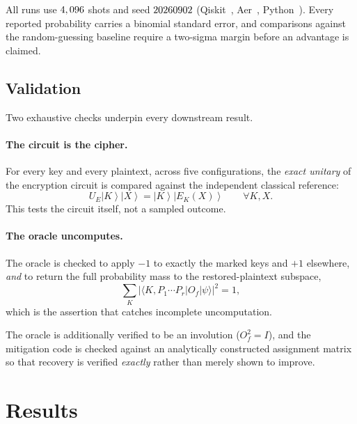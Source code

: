 \documentclass[11pt,a4paper]{article}
\newcommand{\ket}[1]{\left|#1\right\rangle}
\newcommand{\Ek}{E_K}
\begin{document}
All runs use $4,096$ shots and seed $20260902$
(Qiskit~\RunQiskit, Aer~\RunAer, Python~\RunPython). Every reported probability
carries a binomial standard error, and comparisons against the random-guessing
baseline require a two-sigma margin before an advantage is claimed.

\subsection{Validation}
\label{sec:validation}

Two exhaustive checks underpin every downstream result.

\paragraph{The circuit is the cipher.} For every key and every plaintext, across
five configurations, the \emph{exact unitary} of the encryption circuit is
compared against the independent classical reference:
\begin{equation}
  U_E \ket{K}\ket{X} = \ket{K}\ket{\Ek(X)}
  \qquad \forall K, X .
\end{equation}
This tests the circuit itself, not a sampled outcome.

\paragraph{The oracle uncomputes.} The oracle is checked to apply $-1$ to
exactly the marked keys and $+1$ elsewhere, \emph{and} to return the full
probability mass to the restored-plaintext subspace,
\begin{equation}
  \sum_{K} \big| \langle K, P_1\cdots P_r | O_f | \psi \rangle \big|^2 = 1 ,
\end{equation}
which is the assertion that catches incomplete uncomputation.

The oracle is additionally verified to be an involution ($O_f^2 = I$), and the
mitigation code is checked against an analytically constructed assignment
matrix so that recovery is verified \emph{exactly} rather than merely shown to
improve.

\section{Results}
\end{document}
